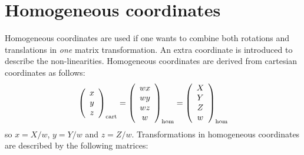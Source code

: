 \documentclass[twoside]{report}
\begin{document}
\section{Homogeneous coordinates}
Homogeneous coordinates are used if one wants to combine both rotations and
translations in {\it one} matrix transformation. An extra coordinate is
introduced to describe the non-linearities. Homogeneous coordinates are derived
from cartesian coordinates as follows:
\[
\left(\begin{array}{c}x\\ y\\ z\end{array}\right)_{\rm cart}=
\left(\begin{array}{c}wx\\ wy\\ wz\\ w\end{array}\right)_{\rm hom}=
\left(\begin{array}{c}X\\ Y\\ Z\\ w\end{array}\right)_{\rm hom}
\]
so $x=X/w$, $y=Y/w$ and $z=Z/w$. Transformations in homogeneous coordinates
are described by the following matrices:
\end{document}

